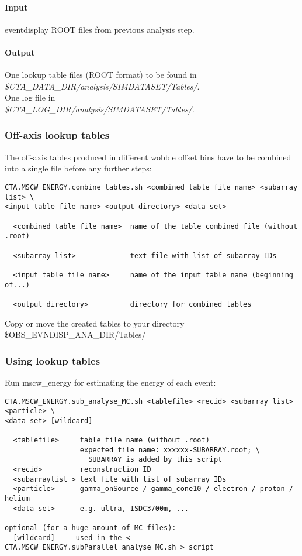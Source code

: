 \documentclass[titlepage,a4paper,twoside,11pt]{report}
\begin{document}
\paragraph{Input}
eventdisplay ROOT files from previous analysis step.

\paragraph{Output}

One lookup table files (ROOT format) to be found in \\
{\it \$CTA\_DATA\_DIR/analysis/SIMDATASET/Tables/}. \\
One log file in \\
{\it \$CTA\_LOG\_DIR/analysis/SIMDATASET/Tables/}.

\subsubsection{Off-axis lookup tables}

The off-axis tables produced in different wobble offset bins have to be combined into a single file before any further steps:

\begin{lstlisting}
CTA.MSCW_ENERGY.combine_tables.sh <combined table file name> <subarray list> \
<input table file name> <output directory> <data set> 

  <combined table file name>  name of the table combined file (without .root)

  <subarray list>             text file with list of subarray IDs

  <input table file name>     name of the input table name (beginning of...)

  <output directory>          directory for combined tables
\end{lstlisting}

Copy or move the created tables to your directory 
\$OBS\_EVNDISP\_ANA\_DIR/Tables/

\subsubsection{Using lookup tables}

Run mscw\_energy for estimating the energy of each
event: 

\begin{lstlisting}
CTA.MSCW_ENERGY.sub_analyse_MC.sh <tablefile> <recid> <subarray list> <particle> \
<data set> [wildcard]

  <tablefile>     table file name (without .root)
                  expected file name: xxxxxx-SUBARRAY.root; \
                    SUBARRAY is added by this script
  <recid>         reconstruction ID
  <subarraylist > text file with list of subarray IDs
  <particle>      gamma_onSource / gamma_cone10 / electron / proton / helium
  <data set>      e.g. ultra, ISDC3700m, ...

optional (for a huge amount of MC files):
  [wildcard]     used in the < CTA.MSCW_ENERGY.subParallel_analyse_MC.sh > script
\end{lstlisting}
\end{document}

